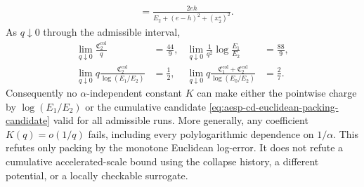 \begin{proposition}
\begin{align}
 &=\frac{2eh}
 {E_2+(e-h)^2+(x_2^\star)^2}.
 \label{eq:aesp-cd-euclidean-family-charge}
\end{align}
As $q\downarrow0$ through the admissible interval,
\begin{align}
 \lim_{q\downarrow0}
 \frac{\mathfrak C_2^{\mathrm{col}}}{q}
 &=\frac{44}{9},
 &
 \lim_{q\downarrow0}
 \frac1{q^2}\log\frac{E_1}{E_2}
 &=\frac{88}{9},
 \label{eq:aesp-cd-euclidean-family-local-limits}\\
 \lim_{q\downarrow0}
 q\frac{\mathfrak C_2^{\mathrm{col}}}
         {\log(E_1/E_2)}
 &=\frac12,
 &
 \lim_{q\downarrow0}
 q\frac{\mathfrak C_1^{\mathrm{col}}+
         \mathfrak C_2^{\mathrm{col}}}
        {\log(E_0/E_2)}
 &=\frac27.
 \label{eq:aesp-cd-euclidean-family-packing-limits}
\end{align}
Consequently no $\alpha$-independent constant $K$ can make either the
pointwise charge by $\log(E_1/E_2)$ or the cumulative candidate
\cref{eq:aesp-cd-euclidean-packing-candidate} valid for all admissible runs.
More generally, any coefficient $K(q)=o(1/q)$ fails, including every
polylogarithmic dependence on $1/\alpha$.
This refutes only packing by the monotone Euclidean log-error.  It does not
refute a cumulative accelerated-scale bound using the collapse history, a
different potential, or a locally checkable surrogate.
\end{proposition}

